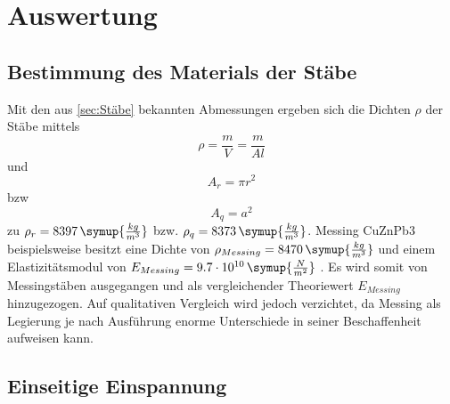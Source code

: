 \section{Auswertung}
\label{sec:Auswertung}
\subsection{Bestimmung des Materials der Stäbe}
\label{sec:Material}
Mit den aus \ref{sec:Stäbe} bekannten Abmessungen ergeben sich die Dichten $\rho$ der Stäbe mittels
\begin{equation}
  \rho = \frac{m}{V} = \frac{m}{Al}
\end{equation}
und
\begin{equation}
  A_r = \pi r^2
\end{equation}
bzw
\begin{equation}
  A_q = a^2
\end{equation}
zu $\rho_r =8397 \, \symup{\frac{kg}{m^3}}$  bzw. $\rho_q = 8373 \, \symup{\frac{kg}{m^3}}$. Messing CuZnPb3 beispielsweise besitzt eine Dichte von $\rho_{Messing} = 8470 \, \symup{ \frac{kg}{m^3}}$ und einem Elastizitätsmodul von $E_{Messing} = 9.7 \cdot 10^{10} \, \symup{\frac{N}{m^2}}$ \cite{DKI}. Es wird somit von Messingstäben ausgegangen und als vergleichender Theoriewert $E_{Messing}$ hinzugezogen. Auf qualitativen Vergleich wird jedoch verzichtet, da Messing als Legierung je nach Ausführung enorme Unterschiede in seiner Beschaffenheit aufweisen kann.
\subsection{Einseitige Einspannung}
\label{sec:Einseitig}


